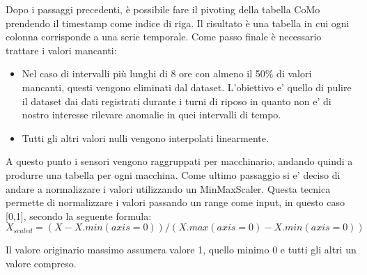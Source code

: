 Dopo i passaggi precedenti, è possibile fare il pivoting della tabella CoMo  prendendo il timestamp come indice di riga. Il risultato è una tabella in cui ogni colonna corrisponde a una serie temporale. 
Come passo finale è necessario trattare i valori mancanti:
\begin{itemize}
\item Nel caso di intervalli più lunghi di 8 ore con almeno il 50\% di valori mancanti, questi vengono eliminati dal dataset. L'obiettivo e' quello di pulire il dataset dai dati registrati durante i turni di riposo in quanto non e' di nostro interesse rilevare anomalie in quei intervalli di tempo.
\item Tutti gli altri valori nulli vengono interpolati linearmente.
\end{itemize}
A questo punto i sensori vengono raggruppati per macchinario, andando quindi a produrre una tabella per ogni macchina.
Come ultimo passaggio si e' deciso di andare a normalizzare i valori utilizzando un MinMaxScaler. Questa tecnica permette di normalizzare i valori passando un range come input, in questo caso [0,1], secondo la seguente formula:
\[X_{scaled} = (X - X.min(axis=0)) / (X.max(axis=0) - X.min(axis=0))\]

Il valore originario massimo assumera valore 1, quello minimo 0 e tutti gli altri un valore compreso.
